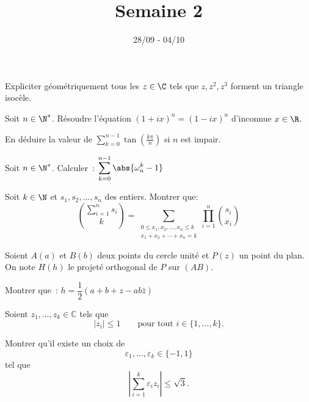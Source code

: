 \documentclass[11pt,a4paper]{article}
\begin{document}
\title{Semaine 2}
\author{}
\date{28/09 - 04/10 }

\maketitle


\begin{exercise}
Expliciter géométriquement tous les $z\in \C$ tels que $z, z^2, z^3$ forment un triangle isocèle.
\end{exercise}


\begin{exercise}
\begin{questions}
\item Soit $n\in \N^*$. Résoudre l'équation $(1+ix)^n=(1-ix)^n$ d'inconnue $x\in \R$.
\item En déduire la valeur de $\displaystyle\sum_{k=0}^{n-1} \tan\left(\frac{k\pi}{n}\right)$ si $n$ est impair.
\end{questions}
\end{exercise}

\begin{exercise}
    Soit $n \in \N^*$. Calculer~: $\displaystyle\sum_{k=0}^{n-1} \abs {\omega_n^k - 1}$
\end{exercise}

\begin{exercise}
    Soit $k \in \N$ et $ s_1, s_2, \dots, s_n$ des entiers.
    Montrer que:
    \[
        \binom{\sum_{i=1}^n s_i}{k} = \sum_{\substack{0 \le x_1,x_2,\dots,x_n \le k \\ x_1 + x_2 + \cdots + x_n = k}} \prod_{i=1}^n \binom{s_i}{x_i}
    \]
\end{exercise}

\begin{exercise}
    Soient $A(a)$ et $B(b)$ deux points du cercle unité et $P(z)$ un point du plan. On note $H(h)$ le projeté orthogonal de $P$ sur $(AB)$.
    
    Montrer que~: $h = \dfrac{1}{2} (a + b + z - a b \bar{z})$
\end{exercise}

\begin{exercise}
Soient $z_1,\ldots,z_k\in\mathbb{C}$ tels que
\[
|z_i|\leq 1
\qquad \text{pour tout } i\in\{1,\ldots,k\}.
\]

Montrer qu'il existe un choix de
\[
\varepsilon_1,\ldots,\varepsilon_k\in\{-1,1\}
\]
tel que
\[
\left|\sum_{i=1}^k \varepsilon_i z_i\right|\leq \sqrt{3}.
\]
\end{exercise}
\end{document}
